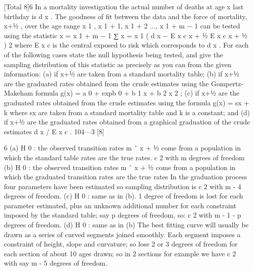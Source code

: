 \documentclass[a4paper,12pt]{article}
\begin{document}
[Total 8]6
In a mortality investigation the actual number of deaths at age x last birthday
is d x . The goodness of fit between the data and the force of mortality, \mu x+1⁄2 ,
over the age range x 1 , x 1 + 1, x 1 + 2 ..., x 1 + m − 1 can be tested using the
statistic
x = x 1 + m − 1
∑
x = x 1
( d
x
− E x c \mu x + 1⁄2
E x c \mu x + 1⁄2
)
2
where E x c is the central exposed to risk which corresponds to d x .
For each of the following cases state the null hypothesis being tested, and give
the sampling distribution of this statistic as precisely as you can from the
given information:
(a) if \mu x+1⁄2 are taken from a standard mortality table;
(b) if \mu x+1⁄2 are the graduated rates obtained from the crude estimates using
the Gompertz-Makeham formula
g(x) = a 0 + exp{b 0 + b 1 x + b 2 x 2 };
(c)
if \mu x+1⁄2 are the graduated rates obtained from the crude estimates using
the formula
g(x) = \mu sx + k
where \mu sx are taken from a standard mortality table and k is a constant;
and
(d)
if \mu x+1⁄2 are the graduated rates obtained from a graphical graduation of
the crude estimates d x / E x c .
104—3
[8]




6
(a)
H 0 : the observed transition rates m ˆ x + 1⁄2 come from a population in which
the standard table rates are the true rates.
c 2 with m degrees of freedom
(b)
H 0 : the observed transition rates m ˆ x + 1⁄2 come from a population in which
the graduated transition rates are the true rates
In the graduation process four parameters have been estimated so
sampling distribution is c 2 with m - 4 degrees of freedom.
(c)
H 0 : same as in (b).
1 degree of freedom is lost for each parameter estimated, plus an
unknown additional number for each constraint imposed by the standard
table; say p degrees of freedom, so:
c 2 with m - 1 - p degrees of freedom.
(d)
H 0 : same as in (b)
The best fitting curve will usually be drawn as a series of curved segments
joined smoothly.
Each segment imposes a constraint of height, slope and curvature; so lose
2 or 3 degrees of freedom for each section of about 10 ages drawn; so in 2
sections for example we have
c 2 with say m - 5 degrees of freedom.
\end{document}
